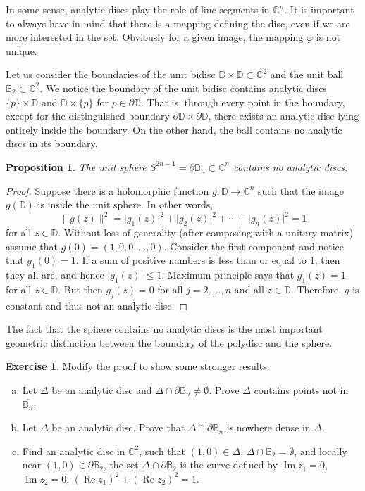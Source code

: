 \documentclass[12pt,openany]{book}
\renewcommand{\Re}{\operatorname{Re}}
\renewcommand{\Im}{\operatorname{Im}}
\newcommand{\sabs}[1]{\lvert {#1} \rvert}
\newcommand{\snorm}[1]{\lVert {#1} \rVert}
\newcommand{\C}{{\mathbb{C}}}
\newcommand{\D}{{\mathbb{D}}}
\newcommand{\bB}{{\mathbb{B}}}
\theoremstyle{plain}
\newtheorem{prop}[thm]{Proposition}
\theoremstyle{remark}
\theoremstyle{definition}
\newenvironment{exbox}{%
    \def\FrameCommand{\vrule width 1pt \relax\hspace{10pt}}%
    \MakeFramed{\advance\hsize-\width\FrameRestore}%
}{%
    \endMakeFramed
}
\newenvironment{exparts}{%
    \leavevmode\begin{enumerate}[a),noitemsep,topsep=0pt,parsep=0pt,partopsep=0pt]
}{%
    \end{enumerate}
}
\theoremstyle{exercise}
\newtheorem{exercise}{Exercise}[section]
\theoremstyle{example}
\begin{document}
In some sense, analytic discs play the role of line segments in $\C^n$.  It
is important to always have in mind that there is a mapping defining the
disc, even if we are more interested in the set.  Obviously for a given
image, the mapping $\varphi$ is not unique.

Let us consider the boundaries of 
the unit bidisc $\D \times \D \subset \C^2$
and the unit ball $\bB_2 \subset \C^2$.  We notice the boundary
of the unit bidisc contains analytic discs $\{p\} \times \D$
and $\D \times \{p\}$ for $p \in \partial \D$.  That is, through
every point in the boundary, except for the distinguished
boundary $\partial \D \times \partial \D$, there exists an analytic disc
lying entirely inside the boundary.  On the other hand, the ball
contains no analytic discs in its boundary.

\begin{prop}
%
The unit sphere $S^{2n-1} = \partial \bB_n \subset \C^n$ 
contains no analytic discs.
\end{prop}

\begin{proof}
Suppose there is a holomorphic function $g \colon \D \to \C^n$
such that the image $g(\D)$ is inside the unit sphere.  In other words,
\begin{equation*}
\snorm{g(z)}^2 = \sabs{g_1(z)}^2 + \sabs{g_2(z)}^2 + \cdots + \sabs{g_n(z)}^2 = 1
\end{equation*}
for all $z \in \D$.  Without loss of generality (after composing with a
unitary matrix) assume that
$g(0) = (1,0,0,\ldots,0)$.  Consider the first component
and notice that $g_1(0) = 1$.  If a sum of
positive numbers is less than or equal to 1,
then they all are, and hence $\sabs{g_1(z)} \leq 1$.  Maximum principle
says
that $g_1(z) = 1$ for all $z \in \D$.  But then $g_j(z) = 0$
for all $j=2,\ldots,n$ and all $z \in \D$.  Therefore, $g$ is constant and
thus not an analytic disc.
\end{proof}

The fact that the sphere contains no analytic discs
is the most important geometric distinction between the boundary of
the polydisc and the sphere.

\begin{exbox}
\begin{exercise}
Modify the proof to show some stronger results.
\begin{exparts}
\item
Let $\Delta$ be an analytic disc
and $\Delta \cap \partial \bB_n \not= \emptyset$.
Prove $\Delta$ contains points not in
$\overline{\bB_n}$.
\item
Let $\Delta$ be an analytic disc.
Prove that $\Delta \cap \partial \bB_n$ is nowhere dense in $\Delta$.
\item
Find an analytic disc in $\C^2$, such that $(1,0) \in \Delta$, $\Delta \cap \bB_2 =
\emptyset$, and 
locally near
$(1,0) \in \partial \bB_2$, the set
$\Delta \cap \partial \bB_2$ is the
curve defined by $\Im z_1=0$, $\Im z_2=0$,
${(\Re z_1)}^2+ {(\Re z_2)}^2 = 1$.
\end{exparts}
\end{exercise}
\end{exbox}
\end{document}
